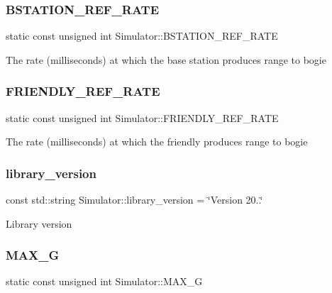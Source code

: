 \subsubsection{\texorpdfstring{B\+S\+T\+A\+T\+I\+O\+N\+\_\+\+R\+E\+F\+\_\+\+R\+A\+TE}{BSTATION\_REF\_RATE}}
{\footnotesize\ttfamily static const unsigned int Simulator\+::\+B\+S\+T\+A\+T\+I\+O\+N\+\_\+\+R\+E\+F\+\_\+\+R\+A\+TE\hspace{0.3cm}{\ttfamily [static]}}

The rate (milliseconds) at which the base station produces range to bogie \mbox{\label{classSimulator_a4936b9aff3bee55866a520bf36b4fb5a}} 
\subsubsection{\texorpdfstring{F\+R\+I\+E\+N\+D\+L\+Y\+\_\+\+R\+E\+F\+\_\+\+R\+A\+TE}{FRIENDLY\_REF\_RATE}}
{\footnotesize\ttfamily static const unsigned int Simulator\+::\+F\+R\+I\+E\+N\+D\+L\+Y\+\_\+\+R\+E\+F\+\_\+\+R\+A\+TE\hspace{0.3cm}{\ttfamily [static]}}

The rate (milliseconds) at which the friendly produces range to bogie \mbox{\label{classSimulator_a4eea5ab08ac7b24af87b81d8babad136}} 
\subsubsection{\texorpdfstring{library\+\_\+version}{library\_version}}
{\footnotesize\ttfamily const std\+::string Simulator\+::library\+\_\+version = \char`\"{}Version 20..\char`\"{}}

Library version \mbox{\label{classSimulator_a95d27d8bc5a3dd5a67aeba981128ba4e}} 
\subsubsection{\texorpdfstring{M\+A\+X\+\_\+G}{MAX\_G}}
{\footnotesize\ttfamily static const unsigned int Simulator\+::\+M\+A\+X\+\_\+G\hspace{0.3cm}{\ttfamily [static]}}

